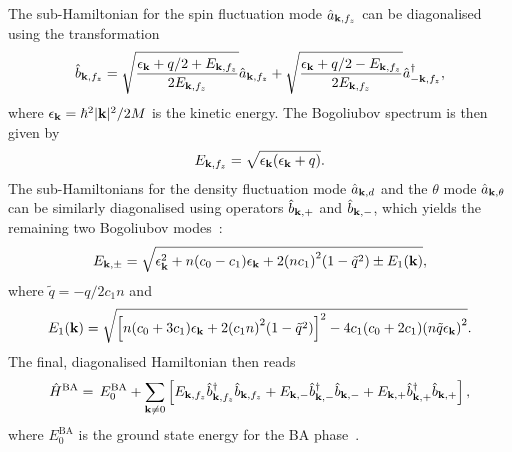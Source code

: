 The sub-Hamiltonian for the spin fluctuation mode \(\hat{a}_{\vb{k}, f_z}\) can
be diagonalised using the transformation
\begin{align}
    \hat{b}_{\vb{k}, f_z} = \sqrt{\frac{\epsilon_{\vb{k}} + q/2
    + E_{\vb{k}, f_z}}{2E_{\vb{k}, f_z}}}\hat{a}_{\vb{k}, f_z}
    + \sqrt{\frac{\epsilon_{\vb{k}} + q/2 - E_{\vb{k}, f_z}}{2E_{\vb{k}, f_z}}}
    \hat{a}_{-\vb{k}, f_z}^\dagger,
\end{align}
where \(\epsilon_{\vb{k}} = \hbar^2|\vb{k}|^2/2M\) is the kinetic energy.
The Bogoliubov spectrum is then given by
\begin{align}\label{eq: e_k-fz}
    E_{\vb{k}, {f_z}} = \sqrt{\epsilon_{\vb{k}}(\epsilon_{\vb{k}} + q)}.
\end{align}
The sub-Hamiltonians for the density fluctuation mode \(\hat{a}_{\vb{k}, d}\)
and the \(\theta \) mode
\(\hat{a}_{\vb{k}, \theta}\) can be similarly diagonalised using operators
\(\hat{b}_{\vb{k}, +}\) and \(\hat{b}_{\vb{k}, -}\), which yields the remaining
two Bogoliubov modes~\cite{Uchino2010}:
\begin{align}\label{eq: e_k-pm}
    E_{\vb{k}, \pm}= \sqrt{\epsilon_{\vb{k}}^2 + n(c_0-c_1)\epsilon_{\vb{k}}
        + 2{(nc_1)}^2(1 - \tilde{q}^2) \pm E_1(\vb{k})},
\end{align}
where \(\tilde{q} = -q/2c_1n\) and
\begin{align}
    E_1(\vb{k}) = \sqrt{{\left[n{(c_0 + 3c_1)}\epsilon_{\vb{k}}
                    + 2{(c_1n)}^2(1-\tilde{q}^2)\right]}^2
        - 4c_1(c_0+2c_1){(n\tilde{q}\epsilon_{\vb{k}})}^2}.
\end{align}
The final, diagonalised Hamiltonian then reads
\begin{align}
    \hat{H}^\text{BA} =\, E_0^\text{BA}
    + \sum_{\vb{k} \neq 0}\left[E_{\vb{k}, f_z}\hat{b}^\dagger_{\vb{k}, f_z}
    \hat{b}_{\vb{k}, f_z}
    + E_{\vb{k}, -}\hat{b}^\dagger_{\vb{k}, -}\hat{b}_{\vb{k}, -}
    + E_{\vb{k}, +}\hat{b}^\dagger_{\vb{k}, +}\hat{b}_{\vb{k}, +}\right],
\end{align}
where \(E_0^\text{BA}\) is the ground state energy for the
BA phase~\cite{Uchino2010}.

